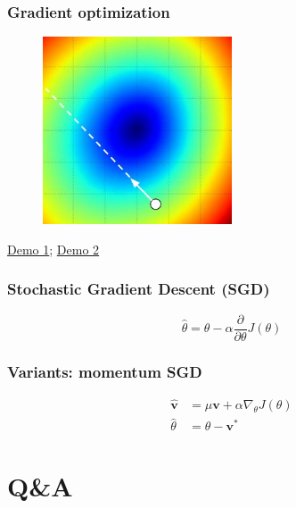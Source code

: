 \documentclass{beamer}
\begin{document}
\begin{frame}
  \frametitle{Gradient optimization}
  \begin{figure}
    \centering
    \includegraphics[width=0.5\textwidth]{stepsize.jpg}
  \end{figure}

  \href{http://rt.dgyblog.com/res/dlworkshop/opt1.gif}{Demo 1}; \href{http://rt.dgyblog.com/res/dlworkshop/opt2.gif}{Demo 2}
\end{frame}

\begin{frame}
  \frametitle{Stochastic Gradient Descent (SGD)}

  \begin{equation*}
      \hat{\theta}=\theta-\alpha\frac{\partial}{\partial \theta}J(\theta)
  \end{equation*}
\end{frame}


\begin{frame}
  \frametitle{Variants: momentum SGD}

  \begin{align*}
      \hat{\mathbf{v}}&=\mu\mathbf{v}+\alpha\nabla_{\theta} J(\theta) \\
      \hat{\theta}&=\theta-\mathbf{v}^{*}
  \end{align*}
\end{frame}


\section*{Q\&A}
\end{document}
